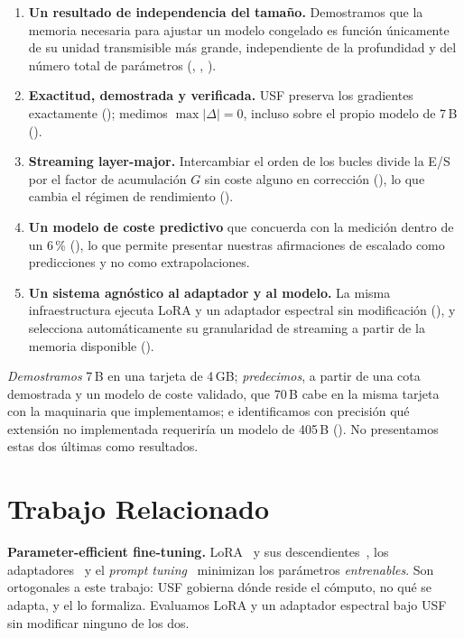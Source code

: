 \documentclass[journal]{IEEEtran}
\newcommand{\usf}{USF}
\begin{document}
\begin{enumerate}[leftmargin=*, label=\arabic*)]
\item \textbf{Un resultado de independencia del tamaño.} Demostramos que la memoria necesaria para
ajustar un modelo congelado es función únicamente de su unidad transmisible más grande,
independiente de la profundidad y del número total de parámetros (,
, ).
\item \textbf{Exactitud, demostrada y verificada.} \usf{} preserva los gradientes exactamente
(); medimos $\max|\Delta|=0$, incluso sobre el propio modelo de 7\,B
().
\item \textbf{Streaming layer-major.} Intercambiar el orden de los bucles divide la E/S por el
factor de acumulación $G$ sin coste alguno en corrección (), lo que cambia el régimen
de rendimiento ().
\item \textbf{Un modelo de coste predictivo} que concuerda con la medición dentro de un 6\,\%
(), lo que permite presentar nuestras afirmaciones de escalado como predicciones y
no como extrapolaciones.
\item \textbf{Un sistema agnóstico al adaptador y al modelo.} La misma infraestructura ejecuta LoRA
y un adaptador espectral sin modificación (), y selecciona automáticamente su
granularidad de streaming a partir de la memoria disponible ().
\end{enumerate}

\emph{Demostramos} 7\,B en una tarjeta de 4\,GB;
\emph{predecimos}, a partir de una cota demostrada y un modelo de coste validado, que 70\,B cabe en
la misma tarjeta con la maquinaria que implementamos; e identificamos con precisión qué extensión
no implementada requeriría un modelo de 405\,B (). No presentamos estas dos
últimas como resultados.

\section{Trabajo Relacionado}
\label{sec:related}

\textbf{Parameter-efficient fine-tuning.} LoRA~\cite{hu2022lora} y sus
descendientes~\cite{liu2024dora}, los adaptadores~\cite{houlsby2019adapters} y el \emph{prompt
tuning}~\cite{lester2021prompt} minimizan los parámetros \emph{entrenables}. Son ortogonales a este
trabajo: \usf{} gobierna dónde reside el cómputo, no qué se adapta, y el  lo
formaliza. Evaluamos LoRA y un adaptador espectral bajo \usf{} sin modificar ninguno de los dos.
\end{document}
